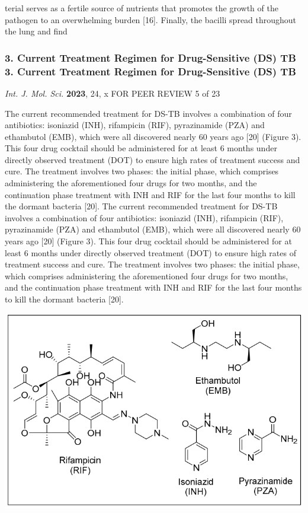 \documentclass{article}
\begin{document}
terial serves as a fertile source of nutrients that promotes the growth of the pathogen to an overwhelming burden [16]. Finally, the bacilli spread throughout the lung and find

\subsubsection{\textbf{3. Current Treatment Regimen for Drug-Sensitive (DS) TB 3. Current Treatment Regimen for Drug-Sensitive (DS) TB}}

\textit{Int. J. Mol. Sci.} \textbf{2023}, 24, x FOR PEER REVIEW 5 of 23

The current recommended treatment for DS-TB involves a combination of four antibiotics: isoniazid (INH), rifampicin (RIF), pyrazinamide (PZA) and ethambutol (EMB), which were all discovered nearly 60 years ago [20] (Figure 3). This four drug cocktail should be administered for at least 6 months under directly observed treatment (DOT) to ensure high rates of treatment success and cure. The treatment involves two phases: the initial phase, which comprises administering the aforementioned four drugs for two months, and the continuation phase treatment with INH and RIF for the last four months to kill the dormant bacteria [20]. The current recommended treatment for DS-TB involves a combination of four antibiotics: isoniazid (INH), rifampicin (RIF), pyrazinamide (PZA) and ethambutol (EMB), which were all discovered nearly 60 years ago [20] (Figure 3). This four drug cocktail should be administered for at least 6 months under directly observed treatment (DOT) to ensure high rates of treatment success and cure. The treatment involves two phases: the initial phase, which comprises administering the aforementioned four drugs for two months, and the continuation phase treatment with INH and RIF for the last four months to kill the dormant bacteria [20].


\includegraphics{_page_4_Figure_5.png}
\end{document}
